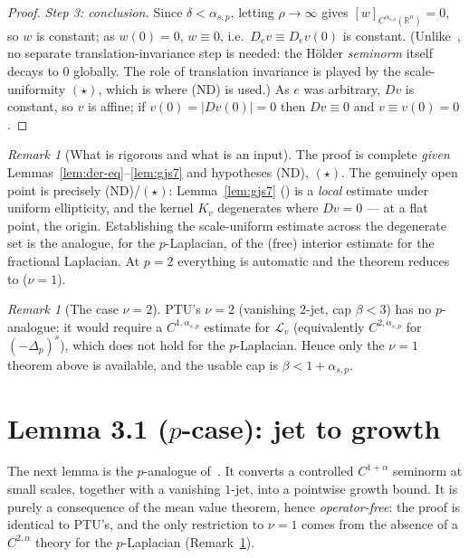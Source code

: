 \documentclass[11pt]{amsart}
\theoremstyle{plain}
\theoremstyle{definition}
\theoremstyle{remark}
\newtheorem{remark}[theorem]{Remark}
\newcommand{\R}{\mathbb{R}}
\newcommand{\fpl}[1]{(-\Delta_p)^{s}#1}
\newcommand{\Lv}{\mathcal L_{v}}
\newcommand{\asp}{\alpha_{s,p}}
\begin{document}
\begin{proof}
\emph{Step 3: conclusion.} Since $\delta<\asp$, letting $\rho\to\infty$ gives
$[w]_{C^{\asp}(\R^n)}=0$, so $w$ is constant; as $w(0)=0$, $w\equiv0$, i.e.\
$D_e v\equiv D_e v(0)$ is constant. (Unlike~\cite{PTU}, no separate
translation-invariance step is needed: the H\"older \emph{seminorm} itself
decays to $0$ globally. The role of translation invariance is played by the
scale-uniformity $(\star)$, which is where \textnormal{(ND)} is used.) As $e$
was arbitrary, $Dv$ is constant, so $v$ is affine; if $v(0)=|Dv(0)|=0$ then
$Dv\equiv0$ and $v\equiv v(0)=0$.
\end{proof}

\begin{remark}[What is rigorous and what is an input]\label{rem:status}
The proof is complete \emph{given} Lemmas~\ref{lem:der-eq}--\ref{lem:gjs7} and
hypotheses \textnormal{(ND)}, $(\star)$. The genuinely open point is precisely
\textnormal{(ND)}/$(\star)$: Lemma~\ref{lem:gjs7} \textnormal{(\cite[\S7]{GJS})}
is a \emph{local} estimate under uniform ellipticity, and the kernel $K_v$
degenerates where $Dv=0$ --- at a flat point, the origin. Establishing the
scale-uniform estimate across the degenerate set is the analogue, for the
$p$-Laplacian, of the (free) interior estimate \cite[Thm 2.2]{PTU} for the
fractional Laplacian. At $p=2$ everything is automatic and the theorem reduces
to \cite[Thm 3.1]{PTU} ($\nu=1$).
\end{remark}

\begin{remark}[The case $\nu=2$]\label{rem:nu2}
PTU's $\nu=2$ (vanishing $2$-jet, cap $\beta<3$) has no $p$-analogue: it would
require a $C^{1,\asp}$ estimate for $\Lv$ (equivalently $C^{2,\asp}$ for
$\fpl{}$), which does not hold for the $p$-Laplacian. Hence only the $\nu=1$
theorem above is available, and the usable cap is $\beta<1+\asp$.
\end{remark}

\section{Lemma 3.1 ($p$-case): jet to growth}\label{sec:jet}
The next lemma is the $p$-analogue of~\cite[Lemma 3.1]{PTU}. It converts a
controlled $C^{1+\alpha}$ seminorm at small scales, together with a vanishing
$1$-jet, into a pointwise growth bound. It is purely a consequence of the mean
value theorem, hence \emph{operator-free}: the proof is identical to PTU's, and
the only restriction to $\nu=1$ comes from the absence of a $C^{2,\alpha}$
theory for the $p$-Laplacian (Remark~\ref{rem:nu2}).
\end{document}
